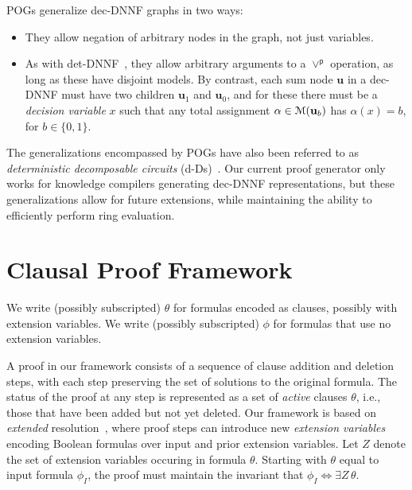 \documentclass[letterpaper,USenglish,cleveref, autoref, thm-restate]{lipics-v2021}
\newcommand{\por}{\mathbin{\lor^\textsf{p}}}
\newcommand{\ifandonlyif}{\Leftrightarrow}
\newcommand{\assign}{\alpha}
\newcommand{\modelset}{{\cal M}}
\newcommand{\inputformula}{\phi_I}
\newcommand{\makenode}[1]{\mathbf{#1}}
\newcommand{\nodeu}{\makenode{u}}
\begin{document}
POGs generalize dec-DNNF graphs in two ways:
\begin{itemize}
\item They allow negation of arbitrary nodes in the graph, not just
  variables.  
\item As with det-DNNF~\cite{darwiche:aaai:2002,darwiche:jair:2002}, they allow arbitrary arguments to a $\por$ operation, as long as
  these have disjoint models.  By contrast, each
  sum node $\nodeu$ in a dec-DNNF must have two children $\nodeu_1$ and $\nodeu_0$, and for these there must be a \emph{decision variable} $x$ such that
  any total assignment $\assign \in  \modelset(\nodeu_b)$ has $\assign(x)=b$, for $b \in \{0,1\}$.
\end{itemize}
The generalizations encompassed by POGs have also been referred to as \emph{deterministic decomposable circuits} (d-Ds)~\cite{monet:amw:2018}.
Our current proof generator only works for knowledge compilers
generating dec-DNNF representations, but these generalizations
allow for future extensions, while maintaining the ability to
efficiently perform ring evaluation.

\section{Clausal Proof Framework}

We write (possibly subscripted) $\theta$ for
formulas encoded as clauses, possibly with extension variables.
We write (possibly subscripted)
$\phi$ for formulas
that use no extension variables.

A proof in our framework consists of a sequence of clause addition
and deletion steps, with each step preserving the set of solutions to
the original formula.
The status of the proof at any step is represented as
a set of \emph{active} clauses $\theta$, i.e., those that
have been added but not yet deleted.
Our framework is based
on \emph{extended} resolution~\cite{Tseitin:1983}, where proof
steps can introduce new \emph{extension variables} encoding Boolean formulas over input and prior extension variables.
Let $Z$
denote the set of extension variables occuring in formula $\theta$.
Starting with  $\theta$ equal to input formula $\inputformula$,
the proof must maintain the invariant that
$\inputformula \ifandonlyif \exists Z\,\theta$.
\end{document}
